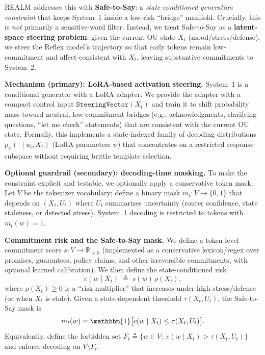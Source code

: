 \documentclass{article}
\begin{document}
REALM addresses this with \textbf{Safe-to-Say}: a \emph{state-conditioned generation constraint} that keeps System~1 inside a low-risk ``bridge'' manifold.
Crucially, this is \emph{not} primarily a sensitive-word filter.
Instead, we treat Safe-to-Say as a \textbf{latent-space steering problem}: given the current OU state $X_t$ (mood/stress/defense), we steer the Reflex model's trajectory so that early tokens remain low-commitment and affect-consistent with $X_t$, leaving substantive commitments to System~2.

\textbf{Mechanism (primary): LoRA-based activation steering.}
System~1 is a conditional generator with a LoRA adapter.
We provide the adapter with a compact control input $\texttt{SteeringVector}(X_t)$ and train it to shift probability mass toward neutral, low-commitment bridges (e.g., acknowledgments, clarifying questions, ``let me check'' statements) that are consistent with the current OU state.
Formally, this implements a state-indexed family of decoding distributions $p_{\psi}(\cdot\mid u_t, X_t)$ (LoRA parameters $\psi$) that concentrates on a restricted response subspace without requiring brittle template selection.

\textbf{Optional guardrail (secondary): decoding-time masking.}
To make the constraint explicit and testable, we optionally apply a conservative token mask.
Let $V$ be the tokenizer vocabulary; define a binary mask $m_t:V\rightarrow\{0,1\}$ that depends on $(X_t,U_t)$ where $U_t$ summarizes uncertainty (router confidence, state staleness, or detected stress).
System~1 decoding is restricted to tokens with $m_t(w)=1$.

\textbf{Commitment risk and the Safe-to-Say mask.}
We define a token-level commitment score $s:V\rightarrow\mathbb{R}_{\ge 0}$ (implemented as a conservative lexicon/regex over promises, guarantees, policy claims, and other irreversible commitments, with optional learned calibration).
We then define the state-conditioned risk
\begin{equation}
  c(w\mid X_t) \;\triangleq\; s(w)\,\rho(X_t),
  \label{eq:commitment-risk}
\end{equation}
where $\rho(X_t)\ge 0$ is a ``risk multiplier'' that increases under high stress/defense (or when $X_t$ is stale).
Given a state-dependent threshold $\tau(X_t,U_t)$, the Safe-to-Say mask is
\begin{equation}
  m_t(w) = \mathbbm{1}\big[c(w\mid X_t) \le \tau(X_t,U_t)\big].
  \label{eq:safe-to-say-mask}
\end{equation}
Equivalently, define the forbidden set $F_t\triangleq\{w\in V:\;c(w\mid X_t)>\tau(X_t,U_t)\}$ and enforce decoding on $V\setminus F_t$.
\end{document}
